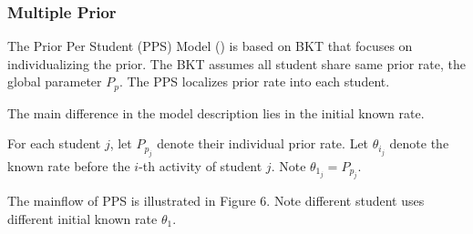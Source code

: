 \documentclass{article}
\begin{document}
\begin{center}
\end{center}

\subsubsection{Multiple Prior}
The Prior Per Student (PPS) Model (\cite{multiprior}) is based on BKT that focuses on individualizing the prior. The BKT assumes all student share same prior rate, the global parameter \( P_p \). The PPS localizes prior rate into each student.

The main difference in the model description lies in the initial known rate.

For each student \( j \), let \( P_{p_j} \) denote their individual prior rate. Let \(\theta_{i_j}\) denote the known rate before the \(i\)-th activity of student \(j\).
Note \(\theta_{1_j} = P_{p_j} \).

The mainflow of PPS is illustrated in Figure 6. Note different student uses different initial known rate \(\theta_1\).
\end{document}
